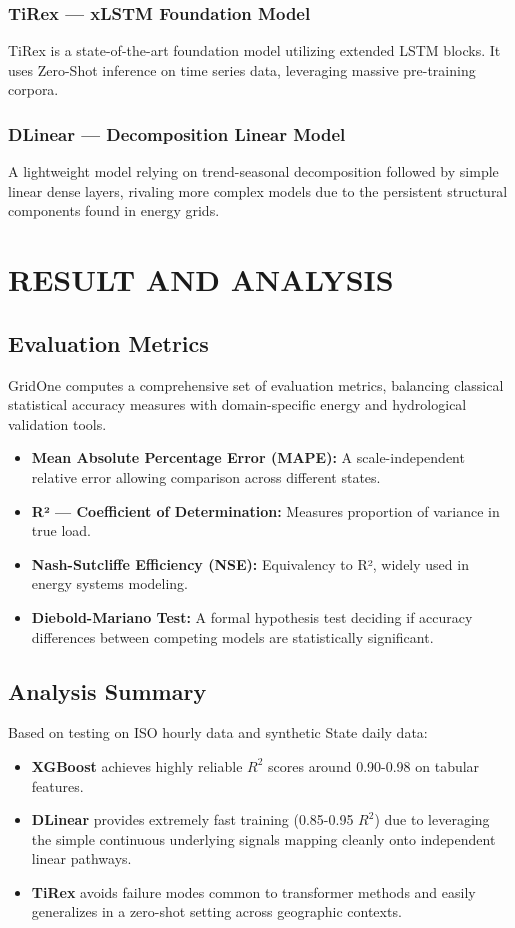 \documentclass[ 12pt,a4paper,twocolumn,fleqn]{report}
\begin{document}
\subsection{TiRex — xLSTM Foundation Model}
TiRex is a state-of-the-art foundation model utilizing extended LSTM blocks. It uses Zero-Shot inference on time series data, leveraging massive pre-training corpora.

\subsection{DLinear — Decomposition Linear Model}
A lightweight model relying on trend-seasonal decomposition followed by simple linear dense layers, rivaling more complex models due to the persistent structural components found in energy grids.

\newpage
  \pagestyle{fancy}
\thisfancypage{%
  \setlength{\fboxsep}{20pt}\doublebox}{}
\normalsize
\chapter{RESULT AND ANALYSIS}
\section{Evaluation Metrics}
\vspace{2mm}
GridOne computes a comprehensive set of evaluation metrics, balancing classical statistical accuracy measures with domain-specific energy and hydrological validation tools.
\begin{itemize}
    \item \textbf{Mean Absolute Percentage Error (MAPE):} A scale-independent relative error allowing comparison across different states.
    \item \textbf{R² — Coefficient of Determination:} Measures proportion of variance in true load.
    \item \textbf{Nash-Sutcliffe Efficiency (NSE):} Equivalency to R², widely used in energy systems modeling.
    \item \textbf{Diebold-Mariano Test:} A formal hypothesis test deciding if accuracy differences between competing models are statistically significant.
\end{itemize}

\section{Analysis Summary}
\vspace{2mm}
Based on testing on ISO hourly data and synthetic State daily data:
\begin{itemize}
    \item \textbf{XGBoost} achieves highly reliable $R^2$ scores around 0.90-0.98 on tabular features.
    \item \textbf{DLinear} provides extremely fast training (0.85-0.95 $R^2$) due to leveraging the simple continuous underlying signals mapping cleanly onto independent linear pathways.
    \item \textbf{TiRex} avoids failure modes common to transformer methods and easily generalizes in a zero-shot setting across geographic contexts.
\end{itemize}
\end{document}

